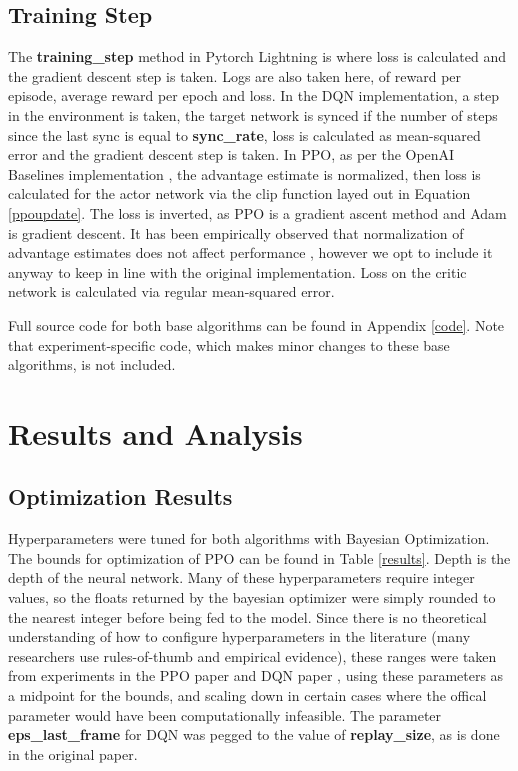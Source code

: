 \documentclass[12pt]{article}
\begin{document}
\subsection{Training Step}
The \textbf{training\_step} method in Pytorch Lightning is where loss is calculated and the gradient descent step is taken. Logs are also taken here, of reward per episode, average reward per epoch and loss. In the DQN implementation, a step in the environment is taken, the target network is synced if the number of steps since the last sync is equal to \textbf{sync\_rate}, loss is calculated as mean-squared error and the gradient descent step is taken. In PPO, as per the OpenAI Baselines implementation \autocite{baselines}, the advantage estimate is normalized, then loss is calculated for the actor network via the clip function layed out in Equation \ref{ppoupdate}. The loss is inverted, as PPO is a gradient ascent method and Adam is gradient descent. It has been empirically observed that normalization of advantage estimates does not affect performance \autocite{DBLP:journals/corr/abs-2006-05990}, however we opt to include it anyway to keep in line with the original implementation. Loss on the critic network is calculated via regular mean-squared error. \\\newline

Full source code for both base algorithms can be found in Appendix \ref{code}. Note that experiment-specific code, which makes minor changes to these base algorithms, is not included. 

\section{Results and Analysis}\label{resultsanal}

\subsection{Optimization Results}\label{optresults}
Hyperparameters were tuned for both algorithms with Bayesian Optimization. The bounds for optimization of PPO can be found in Table \ref{results}. Depth is the depth of the neural network. Many of these hyperparameters require integer values, so the floats returned by the bayesian optimizer were simply rounded to the nearest integer before being fed to the model. Since there is no theoretical understanding of how to configure hyperparameters in the literature (many researchers use rules-of-thumb and empirical evidence), these ranges were taken from experiments in the PPO paper \autocite{schulman2017proximal} and DQN paper \autocite{Mnih2015}, using these parameters as a midpoint for the bounds, and scaling down in certain cases where the offical parameter would have been computationally infeasible. The parameter \textbf{eps\_last\_frame} for DQN was pegged to the value of \textbf{replay\_size}, as is done in the original paper.
\end{document}
